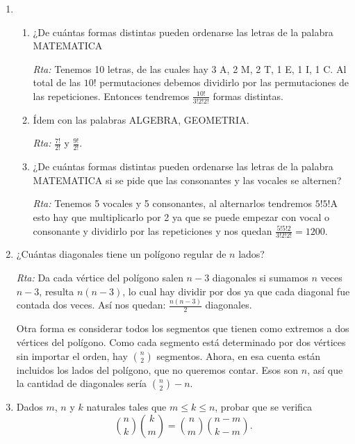 \documentclass[12pt,spanish,makeidx]{amsbook}
\begin{document}
\begin{enumerate}
\begin{enumerate}
\end{enumerate}

\medskip

\item 
\begin{enumerate}
\item 
 ¿De cuántas formas distintas pueden ordenarse las letras de la palabra MATEMATICA

\noindent\textit{Rta:} Tenemos 10 letras, de las cuales hay 3 A, 2 M, 2 T, 1 E, 1 I, 1 C. Al total de las $10!$ permutaciones debemos dividirlo por las permutaciones de las repeticiones. Entonces tendremos $\frac{10!}{3!2!2!}$ formas distintas.

\item Ídem con las palabras ALGEBRA, GEOMETRIA.

\noindent\textit{Rta:}  $\frac{7!}{2!}$ y $\frac{9!}{2!}$.

\item ¿De cuántas formas distintas pueden ordenarse las letras de la palabra MATEMATICA
si se pide que las consonantes y las vocales se alternen?

\noindent\textit{Rta:} Tenemos 5 vocales y 5 consonantes, al alternarlos tendremos $5!5!$A esto hay que multiplicarlo por 2 ya que se puede empezar con vocal o consonante y dividirlo por las repeticiones y nos quedan $\frac{5!5!2}{3!2!2!}=1200$.
\end{enumerate}

\medskip

\item ¿Cuántas diagonales tiene un polígono regular de $n$ lados?

\noindent\textit{Rta:} Da cada vértice del polígono salen $n-3$ diagonales si sumamos $n$ veces $n-3$, resulta $n(n-3)$,  lo cual hay dividir por dos ya que cada diagonal fue contada dos veces. Así nos quedan: $ \frac{n(n-3)}{2}$ diagonales.

Otra forma es considerar todos los segmentos que tienen como extremos a dos vértices del polígono. Como cada segmento está determinado por dos vértices sin importar el orden, hay $\binom{n}{2}$ segmentos. Ahora, en esa cuenta están incluidos los lados del polígono, que no queremos contar. Esos son $n$, así que la cantidad de diagonales sería $\binom{n}{2}-n$.

\medskip

\item Dados $m$, $n$ y $k$ naturales tales que $m \le k \le n$, probar que se verifica
\begin{equation*}
\binom{n}{k}\binom{k}{m} = \binom{n}{m}\binom{n-m}{k-m}.
\end{equation*}


\end{enumerate}
\end{document}
